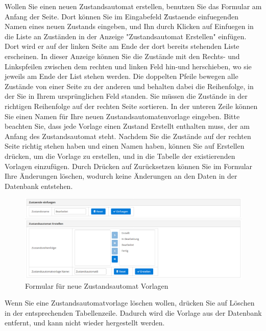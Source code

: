 \documentclass[enabledeprecatedfontcommands,fontsize=12pt,paper=a4,twoside]{scrartcl}
\begin{document}
Wollen Sie einen neuen Zustandsautomat erstellen, benutzen Sie das Formular am Anfang der Seite. Dort können Sie im Eingabefeld \"Zustaende einfuegen\" den Namen eines neuen Zustands eingeben, und Ihn durch Klicken auf Einfuegen in die Liste an Zuständen in der Anzeige "Zustandsautomat Erstellen" einfügen. Dort wird er auf der linken Seite am Ende der dort bereits stehenden Liste erscheinen. In dieser Anzeige können Sie die Zustände mit den Rechts- und Linkspfeilen zwischen dem rechten und linken Feld hin-und herschieben, wo sie jeweils am Ende der List stehen werden. Die doppelten Pfeile bewegen alle Zustände von einer Seite zu der anderen und behalten dabei die Reihenfolge, in der Sie in Ihrem ursprünglichen Feld standen. Sie müssen die Zustände in der richtigen Reihenfolge auf der rechten Seite sortieren. In der unteren Zeile können Sie einen Namen für Ihre neuen Zustandsautomatenvorlage eingeben. Bitte beachten Sie, dass jede Vorlage einen Zustand Erstellt enthalten muss, der am Anfang des Zustandsautomat steht. 
Nachdem Sie die Zustände auf der rechten Seite richtig stehen haben und einen Namen haben, können Sie auf Erstellen drücken, um die Vorlage zu erstellen, und in die Tabelle der existierenden Vorlagen einzufügen. Durch Drücken auf Zurücksetzen können Sie im Formular Ihre Änderungen löschen, wodurch keine Änderungen an den Daten in der Datenbank entstehen. \\

\begin{figure}[h!]
\begin{center}
 \includegraphics[width=\textwidth]{screenshots/pk/zustandsautomatformular.png}
  \caption{Formular für neue Zustandsautomat Vorlagen}
  \label{fig:boat2}
\end{center}
\end{figure}


Wenn Sie eine Zustandsautomatvorlage löschen wollen, drücken Sie auf Löschen in der entsprechenden Tabellenzeile. Dadurch wird die Vorlage aus der Datenbank entfernt, und kann nicht wieder hergestellt werden. \\
\end{document}
